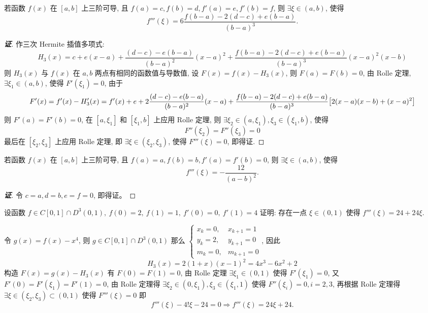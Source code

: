 \begin{theorem}
    若函数 $f(x)\text{ 在 }[a,b]$ 上三阶可导, 且 $f(a)=c,f(b)=d,f'(a)=e,f'(b)=f$, 则 $\exists\xi\in(a,b)$, 使得 $$f'''(\xi)=6\dfrac{f(b-a)-2(d-c)+e(b-a)}{(b-a)^3}.$$
\end{theorem}
\begin{proof}[{\songti \textbf{证}}]
    作三次 Hermite 插值多项式: $$H_3(x)=c+e(x-a)+\dfrac{(d-c)-e(b-a)}{(b-a)^2}(x-a)^2+\dfrac{f(b-a)-2(d-c)+e(b-a)}{(b-a)^3}(x-a)^2(x-b)$$
    则 $H_3(x)$ 与 $f(x)$ 在 $a,b$ 两点有相同的函数值与导数值, 设 $F(x)=f(x)-H_3(x)$, 则 $F(a)=F(b)=0$, 由 Rolle 定理, $\exists\xi_1\in(a,b)$, 使得 $F'(\xi_1)=0$, 
    由于 $$F'(x)=f'(x)-H_3'(x)=f'(x)+e+2\dfrac{(d-c)-e(b-a)}{(b-a)^2}(x-a)+\dfrac{f(b-a)-2(d-c)+e(b-a)}{(b-a)^3}\qty[2(x-a)(x-b)+(x-a)^2]$$
    则 $F'(a)=F'(b)=0$, 在 $[a,\xi_1]$ 和 $[\xi_1,b]$ 上应用 Rolle 定理, 则 $\exists\xi_2\in(a,\xi_1),\xi_3\in(\xi_1,b)$, 使得 $$F''(\xi_2)=F''(\xi_3)=0$$
    最后在 $[\xi_2,\xi_3]$ 上应用 Rolle 定理, 即 $\exists\xi\in(\xi_2,\xi_3)$, 使得 $F'''(\xi)=0$, 即得证.
\end{proof}
\begin{inference}
    若函数 $f(x)\text{ 在 }[a,b]$ 上三阶可导, 且 $f(a)=a,f(b)=b,f'(a)=f'(b)=0$, 则 $\exists\xi\in(a,b)$, 使得 $$f'''(\xi)=-\dfrac{12}{(a-b)^2}.$$
\end{inference}
\begin{proof}[{\songti \textbf{证}}]
    令 $c=a,d=b,e=f=0$, 即得证。
\end{proof}

\begin{example}
    设函数 $f\in C[0,1]\cap D^3(0,1),~f(0)=2,~f(1)=1,~f'(0)=0,~f'(1)=4$ 证明: 存在一点 $\xi\in(0,1)$ 使得 $f'''(\xi)=24+24\xi.$
\end{example}
\begin{solution}
    令 $g(x)=f(x)-x^4$, 则 $g\in C[0,1]\cap D^3(0,1)$ 那么 $\begin{cases}
            x_k=0  , & x_{k+1}=1 \\
            y_k=2  , & y_{k+1}=0 \\
            m_k=0  , & m_{k+1}=0
        \end{cases}$, 因此
        $$H_3(x)=2(1+x)(x-1)^2=4x^3-6x^2+2$$
        构造 $F(x)=g(x)-H_3(x)$ 有 $F(0)=F(1)=0$, 由 Rolle 定理 $\exists\xi_1\in(0,1)$ 使得 $F'(\xi_1)=0$, 
        又 $F'(0)=F'(\xi_1)=F'(1)=0$, 由 Rolle 定理得 $\exists \xi_2\in(0,\xi_1),\xi_3\in(\xi_1,1)$ 使得 $F''(\xi_i)=0,i=2,3$, 
        再根据 Rolle 定理得 $\exists\xi\in(\xi_2,\xi_3)\subset(0,1)$ 使得 $F'''(\xi)=0$ 即
        $$f'''(\xi)-4!\xi-24=0\Rightarrow f'''(\xi)=24\xi+24.$$
\end{solution}